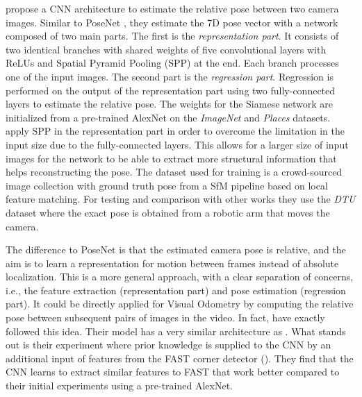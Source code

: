 		
			\cite{melekhov2017poseCNN} propose a CNN architecture to estimate the relative pose between two camera images.
			Similar to PoseNet \cite{kendall2015posenet}, they estimate the 7D pose vector with a network composed of two main parts.
			The first is the \emph{representation part}.
			It consists of two identical branches with shared weights of five convolutional layers with ReLUs and Spatial Pyramid Pooling (SPP) at the end.
			Each branch processes one of the input images.
			The second part is the \emph{regression part}.
			Regression is performed on the output of the representation part using two fully-connected layers to estimate the relative pose.
			The weights for the Siamese network are initialized from a pre-trained AlexNet on the \emph{ImageNet} and \emph{Places} datasets.
			\citeauthor{melekhov2017poseCNN} apply SPP in the representation part in order to overcome the limitation in the input size due to the fully-connected layers.
			This allows for a larger size of input images for the network to be able to extract more structural information that helps reconstructing the pose.
			The dataset used for training is a crowd-sourced image collection with ground truth pose from a SfM pipeline based on local feature matching.
			For testing and comparison with other works they use the \emph{DTU} dataset where the exact pose is obtained from a robotic arm that moves the camera.
			
			The difference to PoseNet is that the estimated camera pose is relative, and the aim is to learn a representation for motion between frames instead of absolute localization.
			This is a more general approach, with a clear separation of concerns, i.e., the feature extraction (representation part) and pose estimation (regression part).
			It could be directly applied for Visual Odometry by computing the relative pose between subsequent pairs of images in the video. 
			In fact, \cite{mohanty2016deepvo} have exactly followed this idea.
			Their model has a very similar architecture as \citeauthor{melekhov2017poseCNN}.
			What stands out is their experiment where prior knowledge is supplied to the CNN by an additional input of features from the FAST corner detector (\cite{rosten2006machine}).
			They find that the CNN learns to extract similar features to FAST that work better compared to their initial experiments using a pre-trained AlexNet.
			
